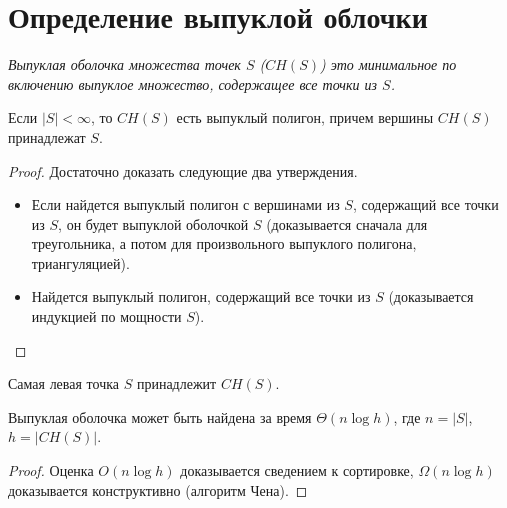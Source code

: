 \section{Определение выпуклой облочки}

\begin{definition}
\itshape{Выпуклая оболочка} множества точек $S$ ($CH(S)$) это минимальное по включению выпуклое множество, 
содержащее все точки из $S$.
\end{definition}

\begin{statement}
Если $|S| < \infty$, то $CH(S)$ есть выпуклый полигон, причем вершины $CH(S)$ принадлежат $S$.
\end{statement}
\begin{proof}
Достаточно доказать следующие два утверждения.
\begin{itemize}
\item
  \label{FstItem}
  Если найдется выпуклый полигон с вершинами из $S$, содержащий все точки из $S$, он будет выпуклой оболочкой $S$
  (доказывается сначала для треугольника, а потом для произвольного выпуклого полигона, триангуляцией).
\item Найдется выпуклый полигон, содержащий все точки из $S$ (доказывается индукцией по мощности $S$).
\end{itemize}
\end{proof}

\begin{statement}
\label{MostLeft}
Самая левая точка $S$ принадлежит $CH(S)$.
\end{statement}

\begin{statement}
Выпуклая оболочка может быть найдена за время $\Theta(n \log h)$, где $n = |S|$, $h = |CH(S)|$.
\end{statement}
\begin{proof}
Оценка $O(n \log h)$ доказывается сведением к сортировке, $\Omega(n \log h)$ доказывается конструктивно (алгоритм Чена).
\end{proof}
